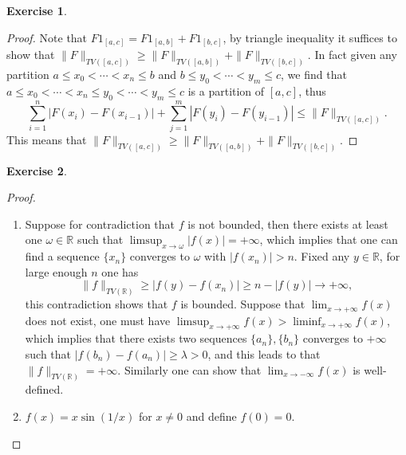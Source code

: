 \documentclass[a4paper]{article}
\newtheorem{ex}{Exercise}[subsection]
\begin{document}
\begin{ex}\end{ex}\begin{proof}
Note that $F1_{[a, c]} = F1_{[a, b]} + F1_{[b, c]}$, by triangle inequality it suffices to show that 
$\|F\|_{TV([a, c])} \geq \|F\|_{TV([a, b])} + \|F\|_{TV([b,c])}$. In fact given any partition 
$a \leq x_0 < \cdots < x_n \leq b$ and $b \leq y_0 < \cdots < y_m \leq c$, we find that 
$a \leq x_0 < \cdots < x_n \leq y_0 < \cdots < y_m \leq c$ is a partition of $[a, c]$, thus $$
\sum_{i = 1}^n |F(x_i) - F(x_{i - 1})| + \sum_{j = 1}^m |F(y_i) - F(y_{i - 1})| \leq \|F\|_{TV([a, c])}.
$$This means that $\|F\|_{TV([a, c])} \geq \|F\|_{TV([a, b])} + \|F\|_{TV([b,c])}$.
\end{proof}

\begin{ex}\end{ex}\begin{proof}\ 
\begin{enumerate}[label = (\roman*)]
\item Suppose for contradiction that $f$ is not bounded, then there exists at least one $\omega \in \mathbb{R}$ such that 
$\limsup_{x \to \omega} |f(x)| = +\infty$, which implies that one can find a sequence $\{x_n\}$ converges to $\omega$
with $|f(x_n)| > n$. Fixed any $y \in \mathbb{R}$, for large enough $n$ one has$$
\|f\|_{TV(\mathbb{R})} \geq |f(y) - f(x_n)| \geq n - |f(y)| \to +\infty,
$$this contradiction shows that $f$ is bounded. Suppose that $\lim_{x \to +\infty} f(x)$does not exist, one must have 
$\limsup_{x \to +\infty} f(x) > \liminf_{x \to +\infty} f(x)$, which implies that there exists two sequences $\{a_n\}, \{b_n\}$
converges to $+\infty$ such that $|f(b_n) - f(a_n)| \geq \lambda > 0$, and this leads to that $\|f\|_{TV(\mathbb{R})} = +\infty$.
Similarly one can show that $\lim_{x \to -\infty} f(x)$ is well-defined.
\item $f(x) = x\sin(1/x)$ for $x \ne 0$ and define $f(0) = 0$.\qedhere
\end{enumerate}
\end{proof}
\end{document}

